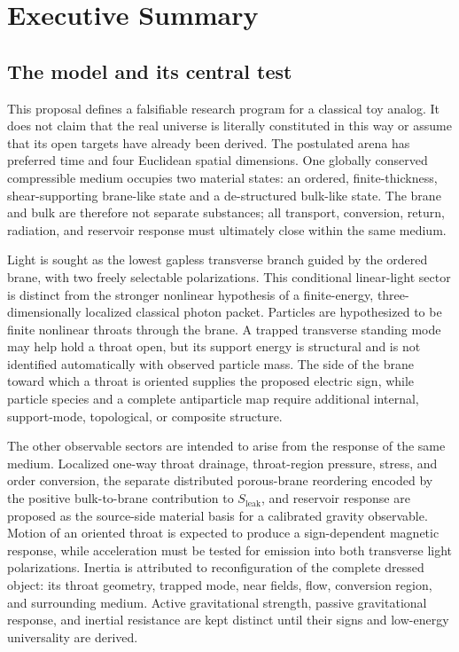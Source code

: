 
\chapter{Executive Summary}
\label{ch:executive-summary}

\section{The model and its central test}

This proposal defines a falsifiable research program for a classical toy analog.
It does not claim that the real universe is literally constituted in this way or
assume that its open targets have already been derived. The postulated arena has
preferred time and four Euclidean spatial dimensions. One globally conserved
compressible medium occupies two material states: an ordered, finite-thickness,
shear-supporting brane-like state and a de-structured bulk-like state. The brane
and bulk are therefore not separate substances; all transport, conversion, return,
radiation, and reservoir response must ultimately close within the same medium.

Light is sought as the lowest gapless transverse branch guided by the ordered
brane, with two freely selectable polarizations. This conditional linear-light
sector is distinct from the stronger nonlinear hypothesis of a finite-energy,
three-dimensionally localized classical photon packet. Particles are hypothesized
to be finite nonlinear throats through the brane. A trapped transverse standing
mode may help hold a throat open, but its support energy is structural and is not
identified automatically with observed particle mass. The side of the brane toward
which a throat is oriented supplies the proposed electric sign, while particle
species and a complete antiparticle map require additional internal, support-mode,
topological, or composite structure.

The other observable sectors are intended to arise from the response of the same
medium. Localized one-way throat drainage, throat-region pressure, stress, and
order conversion, the separate distributed porous-brane reordering encoded by
the positive bulk-to-brane contribution to \(S_{\mathrm{leak}}\), and reservoir
response are proposed as the source-side material basis for a calibrated gravity
observable. Motion of an oriented throat is expected to produce a sign-dependent
magnetic response, while acceleration must be tested for emission into both
transverse light polarizations. Inertia is attributed to reconfiguration of the
complete dressed object: its throat geometry, trapped mode, near fields, flow,
conversion region, and surrounding medium. Active gravitational strength,
passive gravitational response, and inertial resistance are kept distinct until
their signs and low-energy universality are derived.

